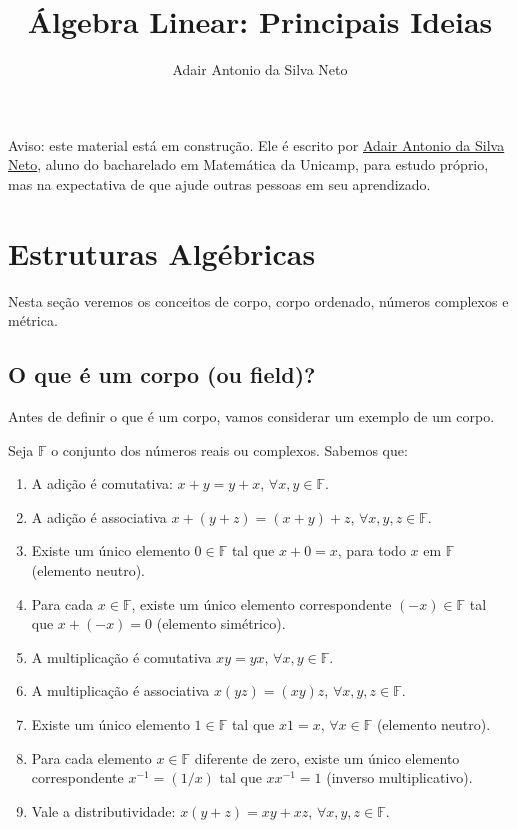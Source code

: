 \documentclass[12pt,a4paper]{article}
\author{Adair Antonio da Silva Neto}
\title{Álgebra Linear: Principais Ideias}
\begin{document}
\clearpage\maketitle
\thispagestyle{empty}

\newpage

\tableofcontents

\newpage
\clearpage
\setcounter{page}{1}

Aviso: este material está em construção. Ele é escrito por \href{https://adairneto.github.io/}{Adair Antonio da Silva Neto}, aluno do bacharelado em Matemática da Unicamp, para estudo próprio, mas na expectativa de que ajude outras pessoas em seu aprendizado. 

\section{Estruturas Algébricas}

Nesta seção veremos os conceitos de corpo, corpo ordenado, números complexos e métrica. 

\subsection{O que é um corpo (ou field)?}

Antes de definir o que é um corpo, vamos considerar um exemplo de um corpo. 

Seja $\mathbb{F}$ o conjunto dos números reais ou complexos. Sabemos que:

\begin{enumerate}
\item A adição é comutativa: $x+y = y+x$, $\forall x, y \in \mathbb{F}$.
\item A adição é associativa $x + (y+z) = (x+y) + z$, $\forall x, y, z \in \mathbb{F}$.
\item Existe um único elemento $0 \in \mathbb{F}$ tal que $x+0 = x$, para todo $x$ em $\mathbb{F}$ (elemento neutro).
\item Para cada $x \in \mathbb{F}$, existe um único elemento correspondente $(-x) \in \mathbb{F}$ tal que $x + (-x) = 0$ (elemento simétrico).
\item A multiplicação é comutativa $xy = yx$, $\forall x,y \in \mathbb{F}$.
\item A multiplicação é associativa $x(yz) = (xy)z$, $\forall x, y, z \in \mathbb{F}$.
\item Existe um único elemento $1 \in \mathbb{F}$ tal que $x1 = x$, $\forall x \in \mathbb{F}$ (elemento neutro).
\item Para cada elemento $x \in \mathbb{F}$ diferente de zero, existe um único elemento correspondente $x^{-1} = (1/x)$ tal que $xx^{-1} = 1$ (inverso multiplicativo).
\item Vale a distributividade: $x(y+z) = xy + xz$, $\forall x,y,z \in \mathbb{F}$.
\end{enumerate}
\end{document}
